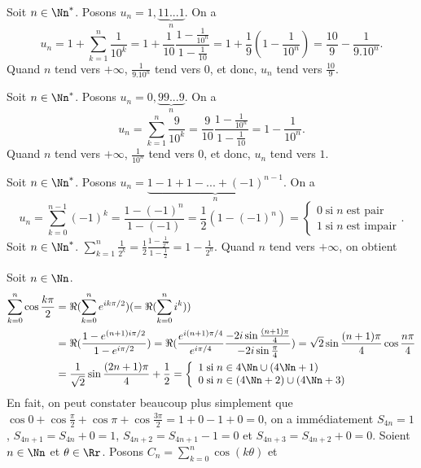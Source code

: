 {\begin{enumerate}
{Soit $n\in\Nn^*$. Posons $u_n=1,\underbrace{11...1}_n$. On a
$$u_n=1+\sum_{k=1}^{n}\frac{1}{10^k}=1+\frac{1}{10}\frac{1-\frac{1}{10^n}}{1-\frac{1}{10}}
=1+\frac{1}{9}(1-\frac{1}{10^n})=\frac{10}{9}-\frac{1}{9.10^n}.$$
Quand $n$ tend vers $+\infty$, $\frac{1}{9.10^n}$ tend vers $0$, et donc, $u_n$ tend vers $\frac{10}{9}$.
\begin{center}
\end{center}
Soit $n\in\Nn^*$. Posons $u_n=0,\underbrace{99...9}_n$. On a
$$u_n=\sum_{k=1}^{n}\frac{9}{10^k}=\frac{9}{10}\frac{1-\frac{1}{10^n}}{1-\frac{1}{10}}
=1-\frac{1}{10^n}.$$
Quand $n$ tend vers $+\infty$, $\frac{1}{10^n}$ tend vers $0$, et donc, $u_n$ tend vers $1$.
\begin{center}
\end{center}
Soit $n\in\Nn^*$. Posons $u_n=\underbrace{1-1+1-...+(-1)^{n-1}}_n$.  On a
$$u_n=\sum_{k=0}^{n-1}(-1)^k=\frac{1-(-1)^n}{1-(-1)}=\frac{1}{2}(1-(-1)^n)=\left\{
\begin{array}{l}
0\;\mbox{si}\;n\;\mbox{est pair}\\
1\;\mbox{si}\;n\;\mbox{est impair}
\end{array}
\right..$$
Soit $n\in\Nn^*$.
$\sum_{k=1}^{n}\frac{1}{2^k}=\frac{1}{2}\frac{1-\frac{1}{2^n}}{1-\frac{1}{2}}=1-\frac{1}{2^n}$. Quand $n$ tend vers
$+\infty$, on obtient
\begin{center}
\end{center}
Soit $n\in\Nn$.
\begin{align*}
\sum_{k=0}^{n}\cos\frac{k\pi}{2}&=\Re(\sum_{k=0}^{n}e^{ik\pi/2})(=\Re(\sum_{k=0}^{n}i^k))\\
 &=\Re(\frac{1-e^{(n+1)i\pi/2}}{1-e^{i\pi/2}})=\Re(\frac{e^{i(n+1)\pi/4}}{e^{i\pi/4}}\frac{-2i\sin\frac{(n+1)\pi}{4}}
 {-2i\sin\frac{\pi}{4}})=\sqrt{2}\sin\frac{(n+1)\pi}{4}\cos\frac{n\pi}{4}\\
 &=\frac{1}{\sqrt{2}}\sin\frac{(2n+1)\pi}{4}+\frac{1}{2}
=\left\{
\begin{array}{l}
1\;\mbox{si}\;n\in4\Nn\cup(4\Nn+1)\\
0\;\mbox{si}\;n\in(4\Nn+2)\cup(4\Nn+3)
\end{array}
\right.
\end{align*}
En fait, on peut constater beaucoup plus simplement que $\cos0+\cos\frac{\pi}{2}+\cos\pi+\cos\frac{3\pi}{2}=1+0-1+0=0$,
on a immédiatement $S_{4n}=1$, $S_{4n+1}=S_{4n}+0=1$, $S_{4n+2}=S_{4n+1}-1=0$ et $S_{4n+3}=S_{4n+2}+0=0$.
Soient $n\in\Nn$ et $\theta\in\Rr$. Posons $C_n=\sum_{k=0}^{n}\cos(k\theta)$ et
}
\end{enumerate}}
